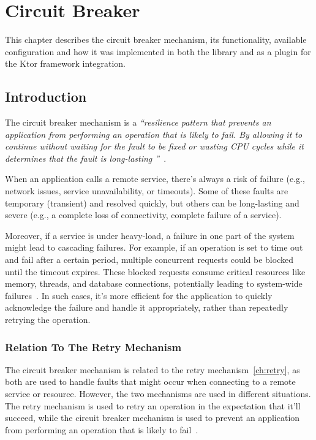 \chapter{Circuit Breaker}\label{ch:circuit-breaker}

This chapter describes the circuit breaker mechanism, its functionality, available configuration and how it was implemented in both the library and as a plugin for the Ktor framework integration.


\section{Introduction}\label{sec:cbreaker-introduction}

The circuit breaker mechanism is a \textit{\enquote{resilience pattern
that prevents an application from performing an operation that is likely to fail.
By allowing it
to continue
without waiting for the fault to be fixed or wasting CPU cycles while it determines that the fault is long-lasting
}}~\cite{microsoft-cbreaker-pattern}.

When an application calls a remote service, there's always a risk of failure
(e.g., network issues, service unavailability, or timeouts).
Some of these faults are temporary (transient) and resolved quickly,
but others can be long-lasting and severe (e.g., a complete loss of connectivity, complete failure of a service).

Moreover, if a service is under heavy-load, a failure in one part of the system might lead to cascading failures.
For example, if an operation is set to time out and fail after a certain period, multiple concurrent requests could be blocked until the timeout expires.
These blocked requests consume critical resources like memory, threads, and database connections, potentially leading to system-wide failures~\cite{microsoft-cbreaker-pattern}.
In such cases, it’s more efficient for the application to quickly acknowledge the failure and handle it appropriately, rather than repeatedly retrying the operation.

\subsection{Relation To The Retry Mechanism}\label{subsec:cbreaker-relation-to-retry}

The circuit breaker mechanism is related to the retry mechanism~\ref{ch:retry}, as both are used to handle faults that might occur when connecting to a remote service or resource.
However, the two mechanisms are used in different situations.
The retry mechanism is used to retry an operation in the expectation that it'll succeed, while the circuit breaker mechanism is used to prevent an application from performing an operation that is likely to fail~\cite{microsoft-cbreaker-pattern}.

